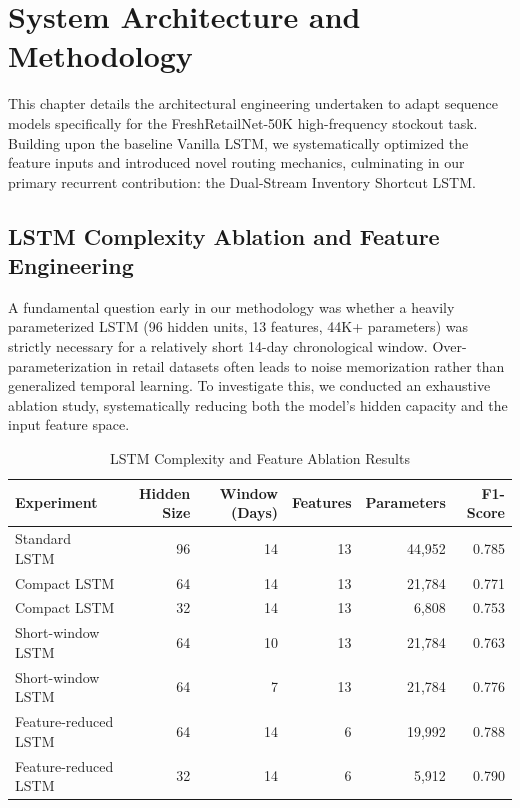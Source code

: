\chapter{System Architecture and Methodology}
\label{chap:methodology}

This chapter details the architectural engineering undertaken to adapt sequence models specifically for the FreshRetailNet-50K high-frequency stockout task. Building upon the baseline Vanilla LSTM, we systematically optimized the feature inputs and introduced novel routing mechanics, culminating in our primary recurrent contribution: the Dual-Stream Inventory Shortcut LSTM.

\section{LSTM Complexity Ablation and Feature Engineering}

A fundamental question early in our methodology was whether a heavily parameterized LSTM (96 hidden units, 13 features, 44K+ parameters) was strictly necessary for a relatively short 14-day chronological window. Over-parameterization in retail datasets often leads to noise memorization rather than generalized temporal learning. To investigate this, we conducted an exhaustive ablation study, systematically reducing both the model's hidden capacity and the input feature space.

\begin{table}[ht]
\centering
\caption{LSTM Complexity and Feature Ablation Results}
\label{tab:lstm_ablation}
\begin{tabular}{lrrrrr}
\toprule
\textbf{Experiment} & \textbf{Hidden Size} & \textbf{Window (Days)} & \textbf{Features} & \textbf{Parameters} & \textbf{F1-Score} \\
\midrule
Standard LSTM & 96 & 14 & 13 & 44,952 & 0.785 \\
Compact LSTM & 64 & 14 & 13 & 21,784 & 0.771 \\
Compact LSTM & 32 & 14 & 13 & 6,808 & 0.753 \\
Short-window LSTM & 64 & 10 & 13 & 21,784 & 0.763 \\
Short-window LSTM & 64 & 7 & 13 & 21,784 & 0.776 \\
Feature-reduced LSTM & 64 & 14 & 6 & 19,992 & 0.788 \\
Feature-reduced LSTM & 32 & 14 & 6 & 5,912 & 0.790 \\
\bottomrule
\end{tabular}
\end{table}

